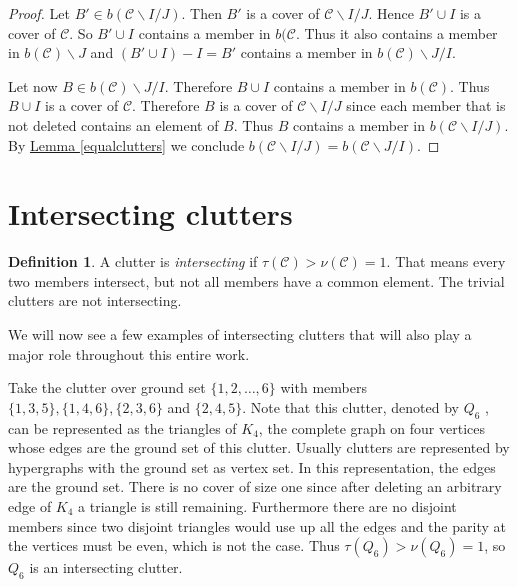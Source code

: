 \documentclass[a4paper, 12pt]{scrbook}
\theoremstyle{definition}
\newtheorem*{definition}{Definition}
\begin{document}
\begin{proof}
    Let $B' \in b(\mathcal{C}\backslash I /J)$. Then $B'$ is a cover of $\mathcal{C}\backslash I /J$.
    Hence $B' \cup I$ is a cover of $\mathcal{C}$.
    So $B' \cup I$ contains a member in $b(\mathcal{C}$. Thus it also contains a member in $b(\mathcal{C})\backslash J$ and $(B' \cup I)-I=B'$ contains a member in $b(\mathcal{C})\backslash J /I$.

    Let now $B \in b(\mathcal{C})\backslash J/I$. Therefore $B \cup I$ contains a member in $b(\mathcal{C})$. Thus $B \cup I$ is a cover of $\mathcal{C}$. Therefore $B$ is a cover of $\mathcal{C}\backslash I /J$ since each member that is not deleted contains an element of $B$. Thus $B$ contains a member in $b(\mathcal{C}\backslash I /J)$.
    By \hyperref[equalclutters]{Lemma \ref*{equalclutters}} we conclude $b(\mathcal{C}\backslash I /J) = b(\mathcal{C} \backslash J / I)$.

\end{proof}


\section{Intersecting clutters}
\begin{definition}
    A clutter is \emph{intersecting} if $\tau(\mathcal{C}) > \nu(\mathcal{C}) = 1$. That means every two members intersect, but not all members have a common element.
    The trivial clutters are not intersecting.
\end{definition}
We will now see a few examples of intersecting clutters that will also play a major role throughout this entire work.

Take the clutter over ground set $\{1,2,\ldots,6\}$ with members $\{1,3,5\}, \{1,4,6\}, \{2,3,6\}$ and $\{2,4,5\}$.
Note that this clutter, denoted by $Q_6$ \cite{q6}, can be represented as the triangles of $K_4$, the complete graph on four vertices whose edges are the ground set of this clutter. Usually clutters are represented by hypergraphs with the ground set as vertex set. In this representation, the edges are the ground set.
There is no cover of size one since after deleting an arbitrary edge of $K_4$ a triangle is still remaining.
Furthermore there are no disjoint members since two disjoint triangles would use up all the edges and the parity at the vertices must be even, which is not the case.
Thus $\tau(Q_6) > \nu(Q_6) = 1$, so $Q_6$ is an intersecting clutter.
\end{document}
